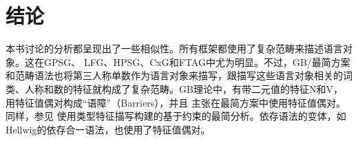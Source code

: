 \chapter{结论}

本书讨论的分析都呈现出了一些相似性。所有框架都使用了复杂范畴来描述语言对象。这在GPSG\indexgpsg、
LFG\indexlfg、HPSG\indexhpsg、CxG\indexcxg 和FTAG\indextag 中尤为明显。不过，GB/最简方案和范畴语法也将第三人称单数作为语言对象来描写，跟描写这些语言对象相关的词类、人称和数的特征就构成了复杂范畴。GB理论中，有带二元值的特征N和V\citep[]{Chomsky70a}， \citet[]{Stabler92a-u}用特征值偶对构成“语障”（Barriers），并且 \citet[--291]{SE2002a}主张在最简方案\indexmp 中使用特征值偶对。同样，参见 \citet{Veenstra98a}使用类型特征描写构建的基于约束的最简分析。依存语法的变体，如Hellwig的依存合一语法，也使用了特征值偶对\citep[]{Hellwig2003a}。

